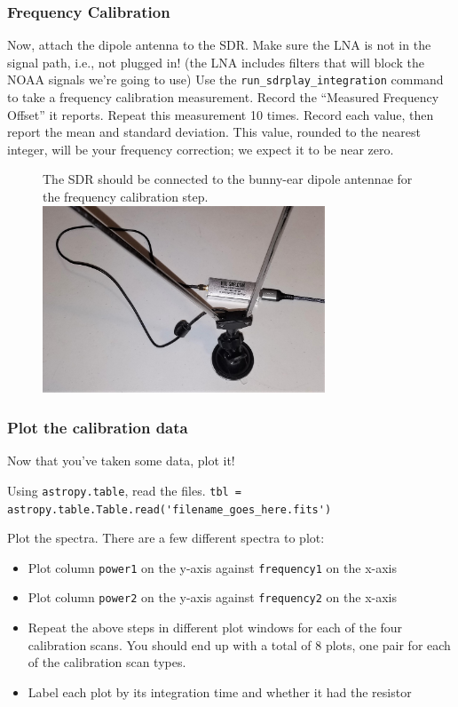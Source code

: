 \documentclass[11pt]{article}
\begin{document}
\subsubsection{Frequency Calibration}
\label{sec:freqcal}
Now, attach the dipole antenna to the SDR.
Make sure the LNA is not in the signal path, i.e., not plugged in!  (the LNA includes filters that will block the NOAA signals we're going to use)
Use the \verb|run_sdrplay_integration| command to take a frequency calibration measurement.
Record the ``Measured Frequency Offset'' it reports.
Repeat this measurement 10 times.
Record each value, then report the mean and standard deviation.
This value, rounded to the nearest integer, will be your frequency correction; we expect it to be near zero.

\begin{figure}[htp]
    \centering
    The SDR should be connected to the bunny-ear dipole antennae for the frequency calibration step.\\
\includegraphics[width=0.75\textwidth]{RadioLabPhotos/sdr_to_bunnyears.jpg}
\end{figure}


\subsubsection{Plot the calibration data}
Now that you've taken some data, plot it!

Using \texttt{astropy.table}, read the files.
\verb|tbl = astropy.table.Table.read('filename_goes_here.fits')|

Plot the spectra.  There are a few different spectra to plot:
\begin{itemize}
    \item Plot column \verb|power1| on the y-axis against \verb|frequency1| on the x-axis
    \item Plot column \verb|power2| on the y-axis against \verb|frequency2| on the x-axis
    \item Repeat the above steps in different plot windows for each of the four
        calibration scans.  You should end up with a total of 8 plots, one pair for
        each of the calibration scan types.
    \item Label each plot by its integration time and whether it had the resistor
\end{itemize}
\end{document}
